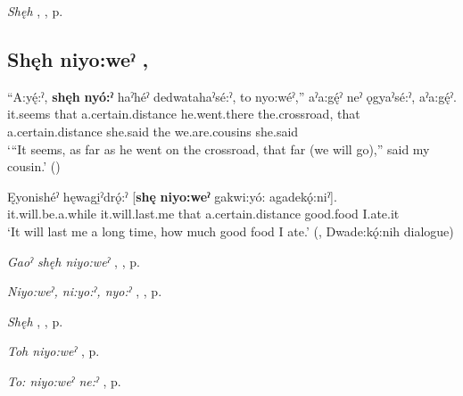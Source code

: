 \begin{CayugaRelated}
\item \textit{Shęh} , , p. \pageref{p:[shęh] `that’}
\end{CayugaRelated}

\subsection*{\textbf{Shęh niyo:weˀ} , } \label{p:[shęh niyo:weˀ]}

\ea
\label{ex:spart41}
\gll “A:yę́:ˀ, \textbf{shęh} \textbf{nyó:ˀ} haˀhéˀ dedwatahaˀsé:ˀ, to nyo:wéˀ,” aˀa:gę́ˀ neˀ ǫgyaˀsé:ˀ, aˀa:gę́ˀ.\\
it.seems that a.certain.distance he.went.there the.crossroad, that a.certain.distance she.said the we.are.cousins she.said\\
\glt ‘“It seems, as far as he went on the crossroad, that far (we will go),” said my cousin.’ (\cite{henry_de_2005})
\z

\ea
\label{ex:spart42}
\gll Ęyonishéˀ hęwagi̱ˀdrǫ́:ˀ [\textbf{shę} \textbf{niyo:weˀ} gakwi:yó: agadekǫ́:niˀ].\\
it.will.be.a.while it.will.last.me that a.certain.distance good.food I.ate.it\\
\glt ‘It will last me a long time, how much good food I ate.’ (\cite[294]{mithun_watewayestanih_1984}, Dwade:kǫ́:nih dialogue)
\z

\begin{CayugaRelated}
\item \textit{Gaoˀ shęh niyo:weˀ} , , p. \pageref{p:[gaoˀ shęh niyo:weˀ]}\\
\item \textit{Niyo:weˀ, ni:yo:ˀ, nyo:ˀ} , , p. \pageref{p:[niyo:weˀ]}\\
\item \textit{Shęh} , , p. \pageref{p:[shęh] `that’}\\
\item \textit{Toh niyo:weˀ} , p. \pageref{p:[toh niyo:weˀ]}\\
\item \textit{To: niyo:weˀ ne:ˀ} , p. \pageref{p:[to: niyo:weˀ ne:ˀ]}
\end{CayugaRelated}

